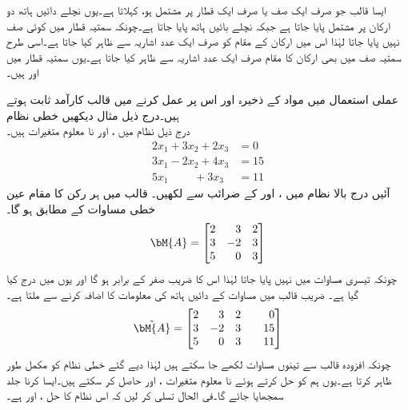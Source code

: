 ایسا قالب جو صرف ایک صف یا صرف ایک قطار پر مشتمل ہو،  کہلاتا ہے۔یوں نچلے دائیں ہاتھ دو ارکان پر مشتمل  پایا جاتا ہے جبکہ نچلے بائیں ہاتھ  پایا جاتا ہے۔چونکہ سمتیہ قطار میں کوئی صف نہیں پایا جاتا لہٰذا اس میں ارکان کے مقام کو صرف ایک عدد اشاریہ سے ظاہر کیا جاتا ہے۔اسی طرح سمتیہ صف میں بھی ارکان کا مقام صرف ایک عدد اشاریہ سے ظاہر کیا جاتا ہے۔یوں سمتیہ قطار میں  اور  ہیں۔

عملی استعمال میں مواد کے ذخیرہ اور اس پر عمل کرنے میں قالب کارآمد ثابت ہوتے ہیں۔درج ذیل مثال دیکھیں
\quad خطی نظام\\
درج ذیل  نظام میں ،  اور  نا معلوم متغیرات ہیں۔ 
\begin{align*}
2x_1+3x_2+2x_3&=0\\
3x_1-2x_2+4x_3&=15\\
5x_1\phantom{+3x_2}+3x_3&=11
\end{align*}
آئیں درج بالا نظام میں ،  اور  کے ضرائب  سے    لکھیں۔  قالب میں ہر رکن کا مقام عین خطی مساوات کے مطابق ہو گا۔
\begin{align*}
\bM{A}=
\begin{bmatrix*}[r]
2&3&2\\
3&-2&3\\
5&0&3
\end{bmatrix*}
\end{align*} 
چونکہ تیسری مساوات میں  نہیں پایا جاتا لہٰذا اس کا  ضریب  صفر کے برابر ہو گا اور یوں  میں  درج کیا گیا ہے۔ ضریب  قالب  میں مساوات کے دائیں ہاتھ کی معلومات کا اضافہ کرنے سے   ملتا ہے۔
\begin{align*}
\tilde{\bM{A}}=
\begin{bmatrix*}[r]
2&3&2&& 0\\
3&-2&3& &15\\
5&0&3&&11
\end{bmatrix*}
\end{align*}
چونکہ افزودہ قالب  سے تینوں مساوات لکھے جا سکتے ہیں لہٰذا دیے گئے خطی نظام کو  مکمل طور ظاہر کرتا ہے۔یوں ہم  کو حل کرتے ہوئے نا معلوم متغیرات ،  اور  حاصل کر سکتے ہیں۔ایسا کرنا جلد سمجھایا جائے گا۔فی الحال تسلی کر لیں کہ اس نظام کا حل ،  اور  ہے۔

